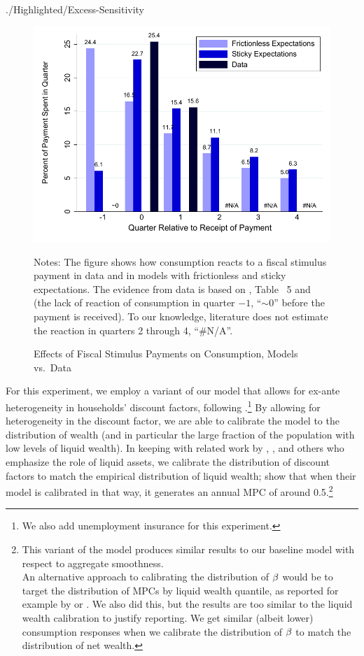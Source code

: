 \begin{verbatimwrite}{./Highlighted/Excess-Sensitivity}
\begin{figure}
  \centering
\caption{Effects of Fiscal Stimulus Payments on Consumption, Models vs.\ Data}
\label{parker}
{ \includegraphics[width=1.0\textwidth]{./Figures/parkerExperiment}}

\begin{flushleft}
  \footnotesize Notes: The figure shows how consumption reacts to a fiscal stimulus payment in data and in models with frictionless and sticky expectations. The evidence from data is based on \cite{psjmMPC2008}, Table ~5 and \cite{brodaParker} (the lack of reaction of consumption in quarter $-1$, ``$\sim0$'' before the payment is received). To our knowledge, literature does not estimate the reaction in quarters 2 through 4, ``\#N/A''.
  \normalsize
  \end{flushleft}
\end{figure}


For this experiment, we employ a variant of our model that allows for ex-ante heterogeneity in households' discount factors, following \cite{cstwMPC}.\footnote{We also add unemployment insurance for this experiment.} By allowing for heterogeneity in the discount factor, we are able to calibrate the model to the distribution of wealth (and in particular the large fraction of the population with low levels of liquid wealth).  In keeping with related work by \cite{kvwWealthyH2m}, \cite{kmvHANK}, and others who emphasize the role of liquid assets, we calibrate the distribution of discount factors to match the empirical distribution of liquid wealth; \cite{cstwMPC} show that when their model is calibrated in that way, it generates an annual MPC of around 0.5.\footnote{This variant of the model produces similar results to our baseline model with respect to aggregate smoothness.\\
An alternative approach to calibrating the distribution of $\beta$ would be to target the distribution of MPCs by liquid wealth quantile, as reported for example by \cite{fhnMPC} or \cite{ckConsumption}. We also did this, but the results are too similar to the liquid wealth calibration to justify reporting.  We get similar (albeit lower) consumption responses when we calibrate the distribution of $\beta$ to match the distribution of net wealth.}


\end{verbatimwrite}
